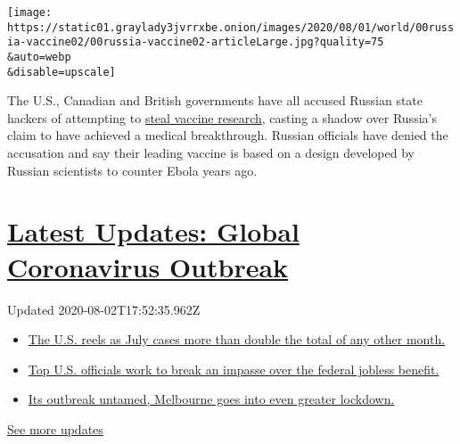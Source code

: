 \texttt{[image: https://static01.graylady3jvrrxbe.onion/images/2020/08/01/world/00russia-vaccine02/00russia-vaccine02-articleLarge.jpg?quality=75\\\&auto=webp\\\&disable=upscale]}

The U.S., Canadian and British governments have all accused Russian
state hackers of attempting to
\href{https://www.nytimes3xbfgragh.onion/2020/07/16/us/politics/vaccine-hacking-russia.html}{steal
vaccine research}, casting a shadow over Russia's claim to have achieved
a medical breakthrough. Russian officials have denied the accusation and
say their leading vaccine is based on a design developed by Russian
scientists to counter Ebola years ago.

\hypertarget{latest-updates-global-coronavirus-outbreak}{%
\section{\texorpdfstring{\href{https://www.nytimes3xbfgragh.onion/2020/08/01/world/coronavirus-covid-19.html?action=click\&pgtype=Article\&state=default\&region=MAIN_CONTENT_1\&context=storylines_live_updates}{Latest
Updates: Global Coronavirus
Outbreak}}{Latest Updates: Global Coronavirus Outbreak}}\label{latest-updates-global-coronavirus-outbreak}}

Updated 2020-08-02T17:52:35.962Z

\begin{itemize}
\tightlist
\item
  \href{https://www.nytimes3xbfgragh.onion/2020/08/01/world/coronavirus-covid-19.html?action=click\&pgtype=Article\&state=default\&region=MAIN_CONTENT_1\&context=storylines_live_updates\#link-34047410}{The
  U.S. reels as July cases more than double the total of any other
  month.}
\item
  \href{https://www.nytimes3xbfgragh.onion/2020/08/01/world/coronavirus-covid-19.html?action=click\&pgtype=Article\&state=default\&region=MAIN_CONTENT_1\&context=storylines_live_updates\#link-780ec966}{Top
  U.S. officials work to break an impasse over the federal jobless
  benefit.}
\item
  \href{https://www.nytimes3xbfgragh.onion/2020/08/01/world/coronavirus-covid-19.html?action=click\&pgtype=Article\&state=default\&region=MAIN_CONTENT_1\&context=storylines_live_updates\#link-2bc8948}{Its
  outbreak untamed, Melbourne goes into even greater lockdown.}
\end{itemize}

\href{https://www.nytimes3xbfgragh.onion/2020/08/01/world/coronavirus-covid-19.html?action=click\&pgtype=Article\&state=default\&region=MAIN_CONTENT_1\&context=storylines_live_updates}{See
more updates}

